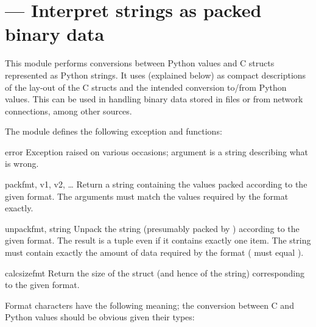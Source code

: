 \section{ ---
         Interpret strings as packed binary data}



This module performs conversions between Python values and C
structs represented as Python strings.  It uses 
(explained below) as compact descriptions of the lay-out of the C
structs and the intended conversion to/from Python values.  This can
be used in handling binary data stored in files or from network
connections, among other sources.

The module defines the following exception and functions:


\begin{excdesc}{error}
  Exception raised on various occasions; argument is a string
  describing what is wrong.
\end{excdesc}

\begin{funcdesc}{pack}{fmt, v1, v2, \textrm{\ldots}}
  Return a string containing the values
   packed according to the given
  format.  The arguments must match the values required by the format
  exactly.
\end{funcdesc}

\begin{funcdesc}{unpack}{fmt, string}
  Unpack the string (presumably packed by ) according to the given format.  The result is a
  tuple even if it contains exactly one item.  The string must contain
  exactly the amount of data required by the format
  ( must equal ).
\end{funcdesc}

\begin{funcdesc}{calcsize}{fmt}
  Return the size of the struct (and hence of the string)
  corresponding to the given format.
\end{funcdesc}

Format characters have the following meaning; the conversion between
C and Python values should be obvious given their types:

